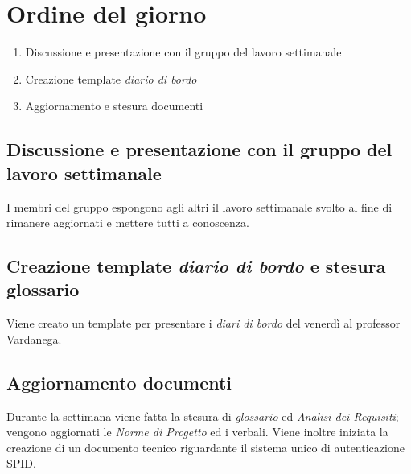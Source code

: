 \section{Ordine del giorno}
\begin{enumerate}
    \item Discussione e presentazione con il gruppo del lavoro settimanale
    \item Creazione template\textit{ diario di bordo}
    \item Aggiornamento e stesura documenti
\end{enumerate}

\subsection{Discussione e presentazione con il gruppo del lavoro settimanale}
I membri del gruppo espongono agli altri il lavoro settimanale svolto al fine di rimanere aggiornati e mettere tutti a conoscenza.
\subsection{Creazione template\textit{ diario di bordo} e stesura glossario}
Viene creato un template per presentare i \textit{diari di bordo} del venerdì al professor Vardanega.
\subsection{Aggiornamento documenti}
Durante la settimana viene fatta la stesura di \textit{glossario} ed \textit{Analisi dei Requisiti}; vengono aggiornati le \textit{Norme di Progetto} ed i verbali.
Viene inoltre iniziata la creazione di un documento tecnico riguardante il sistema unico di autenticazione SPID. 
